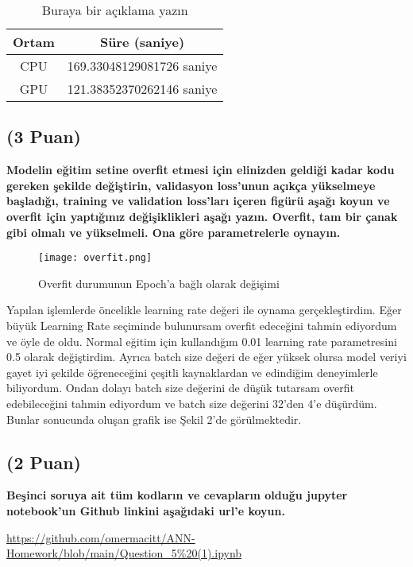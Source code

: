 \documentclass[11pt]{article}
\begin{document}
\begin{table}[ht!]
    \centering
    \caption{Buraya bir açıklama yazın}
    \begin{tabular}{c|c}
        Ortam & Süre (saniye) \\\hline
        CPU & 169.33048129081726 saniye \\
        GPU & 121.38352370262146 saniye\\
    \end{tabular}
    \label{tab:my_table}
\end{table}

\subsection{(3 Puan)} \textbf{Modelin eğitim setine overfit etmesi için elinizden geldiği kadar kodu gereken şekilde değiştirin, validasyon loss'unun açıkça yükselmeye başladığı, training ve validation loss'ları içeren figürü aşağı koyun ve overfit için yaptığınız değişiklikleri aşağı yazın. Overfit, tam bir çanak gibi olmalı ve yükselmeli. Ona göre parametrelerle oynayın.}



\begin{figure}[ht!]
    \centering
    \texttt{[image: overfit.png]}
    \caption{Overfit durumunun Epoch'a bağlı olarak değişimi}
    \label{fig:my_pic}
\end{figure}
Yapılan işlemlerde öncelikle learning rate değeri ile oynama gerçekleştirdim. Eğer büyük Learning Rate seçiminde bulunursam overfit edeceğini tahmin ediyordum ve öyle de oldu. Normal eğitim için kullandığım 0.01 learning rate parametresini 0.5 olarak değiştirdim. Ayrıca batch size değeri de eğer yüksek olursa model veriyi gayet iyi şekilde öğreneceğini çeşitli kaynaklardan ve edindiğim deneyimlerle biliyordum. Ondan dolayı batch size değerini de düşük tutarsam overfit edebileceğini tahmin ediyordum ve batch size değerini 32'den 4'e düşürdüm. Bunlar sonucunda oluşan grafik ise Şekil 2'de görülmektedir.

\subsection{(2 Puan)} \textbf{Beşinci soruya ait tüm kodların ve cevapların olduğu jupyter notebook'un Github linkini aşağıdaki url'e koyun.}

\url{https://github.com/omermacitt/ANN-Homework/blob/main/Question_5%20(1).ipynb}
\end{document}

